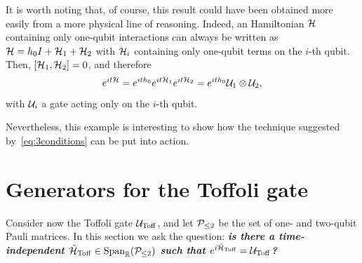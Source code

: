 \begin{example}[label={ex:cnot_with_conditions}]
It is worth noting that, of course, this result could have been obtained more easily from a more physical line of reasoning. Indeed, an Hamiltonian $\mathcal{H}$ containing only one-qubit interactions can always be written as $\mathcal{H}=h_0 I+\mathcal{H}_1+\mathcal{H}_2$ with $\mathcal{H}_i$ containing only one-qubit terms on the $i$-th qubit. Then, $[\mathcal{H}_1,\mathcal{H}_2]=0$, and therefore
\begin{equation}
    e^{it\mathcal{H}}=e^{it h_0}e^{it\mathcal{H}_1}e^{it\mathcal{H}_2}=e^{it h_0} \mathcal{U}_1\otimes\mathcal{U}_2,
\end{equation}
with $\mathcal{U}_i$ a gate acting only on the $i$-th qubit.

Nevertheless, this example is interesting to show how the technique suggested by~\cref{eq:3conditions} can be put into action.
\end{example}

\section{Generators for the Toffoli gate}
Consider now the Toffoli gate $\mathcal{U}_{\operatorname{Toff}}$, and let $\mathcal{P}_{\le2}$ be the set of one- and two-qubit Pauli matrices. In this section we ask the question: \textit{\textbf{is there a time-independent $\tilde{\mathcal{H}}_{\operatorname{Toff}}\in\operatorname{Span}_{\mathbb{R}}(\mathcal{P}_{\le2})$ such that $e^{i\tilde{\mathcal{H}}_{\operatorname{Toff}}}=\mathcal{U}_{\operatorname{Toff}}$?}}

